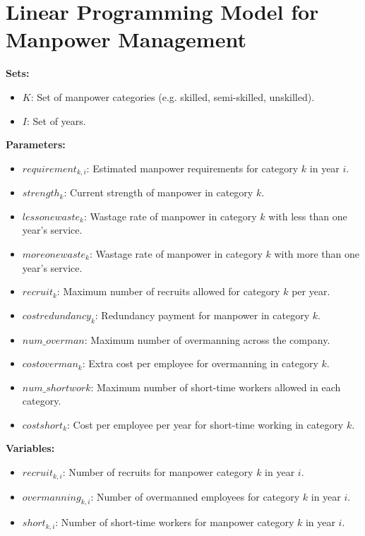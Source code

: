 \documentclass{article}
\begin{document}
\section*{Linear Programming Model for Manpower Management}

\noindent \textbf{Sets:}
\begin{itemize}
    \item $K$: Set of manpower categories (e.g. skilled, semi-skilled, unskilled).
    \item $I$: Set of years.
\end{itemize}

\noindent \textbf{Parameters:}
\begin{itemize}
    \item $requirement_{k, i}$: Estimated manpower requirements for category $k$ in year $i$.
    \item $strength_{k}$: Current strength of manpower in category $k$.
    \item $lessonewaste_{k}$: Wastage rate of manpower in category $k$ with less than one year's service.
    \item $moreonewaste_{k}$: Wastage rate of manpower in category $k$ with more than one year's service.
    \item $recruit_{k}$: Maximum number of recruits allowed for category $k$ per year.
    \item $costredundancy_{k}$: Redundancy payment for manpower in category $k$.
    \item $num\_overman$: Maximum number of overmanning across the company.
    \item $costoverman_{k}$: Extra cost per employee for overmanning in category $k$.
    \item $num\_shortwork$: Maximum number of short-time workers allowed in each category.
    \item $costshort_{k}$: Cost per employee per year for short-time working in category $k$.
\end{itemize}

\noindent \textbf{Variables:}
\begin{itemize}
    \item $recruit_{k, i}$: Number of recruits for manpower category $k$ in year $i$.
    \item $overmanning_{k, i}$: Number of overmanned employees for category $k$ in year $i$.
    \item $short_{k, i}$: Number of short-time workers for manpower category $k$ in year $i$.
\end{itemize}
\end{document}
